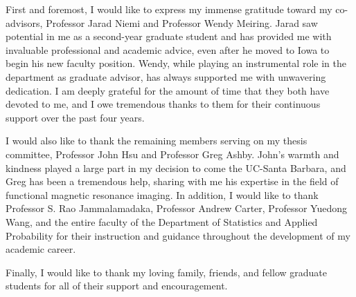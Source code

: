   \approvalpage
  \copyrightpage

  \begin{acknowledgements}

  First and foremost, I would like to express my immense gratitude toward my co-advisors, Professor Jarad Niemi and Professor Wendy Meiring. Jarad saw potential in me as a second-year graduate student and has provided me with invaluable professional and academic advice, even after he moved to Iowa to begin his new faculty position. Wendy, while playing an instrumental role in the department as graduate advisor, has always supported me with unwavering dedication. I am deeply grateful for the amount of time that they both have devoted to me, and I owe tremendous thanks to them for their continuous support over the past four years.

  I would also like to thank the remaining members serving on my thesis committee, Professor John Hsu and Professor Greg Ashby. John's warmth and kindness played a large part in my decision to come the UC-Santa Barbara, and Greg has been a tremendous help, sharing with me his expertise in the field of functional magnetic resonance imaging. In addition, I would like to thank Professor S. Rao Jammalamadaka, Professor Andrew Carter, Professor Yuedong Wang, and the entire faculty of the Department of Statistics and Applied Probability for their instruction and guidance throughout the development of my academic career.

  Finally, I would like to thank my loving family, friends, and fellow graduate students for all of their support and encouragement.

  \end{acknowledgements}
\ssp
